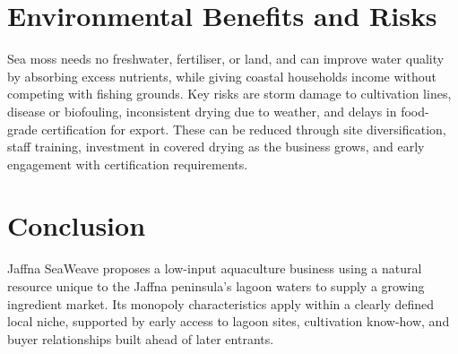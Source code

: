 \section{Environmental Benefits and Risks}
Sea moss needs no freshwater, fertiliser, or land, and can improve water quality by absorbing excess nutrients, while giving coastal households income without competing with fishing grounds. Key risks are storm damage to cultivation lines, disease or biofouling, inconsistent drying due to weather, and delays in food-grade certification for export. These can be reduced through site diversification, staff training, investment in covered drying as the business grows, and early engagement with certification requirements.

\section{Conclusion}
Jaffna SeaWeave proposes a low-input aquaculture business using a natural resource unique to the Jaffna peninsula's lagoon waters to supply a growing ingredient market. Its monopoly characteristics apply within a clearly defined local niche, supported by early access to lagoon sites, cultivation know-how, and buyer relationships built ahead of later entrants.


